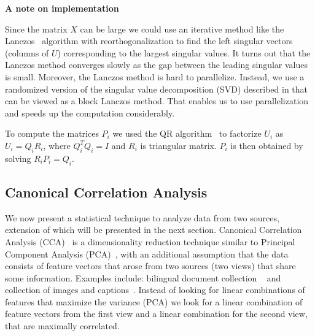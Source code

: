 \documentclass[twoside,11pt]{article}
\begin{document}
\textbf{A note on implementation}

  Since the matrix $X$ can be large we could use an iterative method like the Lanczos~\cite{golub} algorithm with reorthogonalization to find the left singular vectors (columns of $U$) corresponding to the largest singular values. It turns out that the Lanczos method converges slowly as the gap between the leading singular values is small. Moreover, the Lanczos method is hard to parallelize. Instead, we use a randomized version of the singular value decomposition (SVD) described in  that can be viewed as a block Lanczos method. That enables us to use parallelization and speeds up the computation considerably.

To compute the matrices $P_i$ we used the QR algorithm~\cite{golub} to factorize $U_i$ as $U_i = Q_i R_i$, where $Q_i^TQ_i = I$ and $R_i$ is triangular matrix. $P_i$ is then obtained by solving $R_i P_i = Q_i$.


\subsection{Canonical Correlation Analysis}\label{sec:CCA}
 We now present a statistical technique to analyze data from two sources, extension of which will be presented in the next section.
%
 Canonical Correlation Analysis (CCA)~\cite{Hotelling} is a dimensionality reduction technique similar to Principal Component Analysis (PCA)~\cite{Pearson1901On}, with an additional assumption that the data consists of feature vectors that arose from two sources (two views) that share some information. Examples include: bilingual document collection ~ and collection of images and captions~. Instead of looking for linear combinations of features that maximize the variance (PCA) we look for a linear combination of feature vectors from the first view and a linear combination for the second view, that are maximally correlated.
\end{document}
